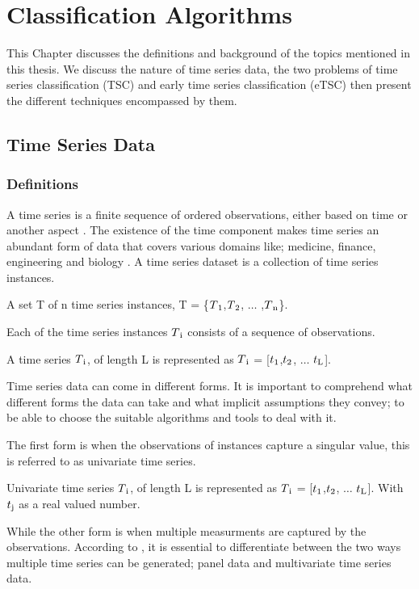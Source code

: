 \chapter{Classification Algorithms}
\label{ChapterClassificationAlgorithms}
This Chapter discusses the definitions and background of the topics mentioned in this thesis.
We discuss the nature of time series data, the two problems of time series classification (TSC) and early time series classification (eTSC) then present the different techniques encompassed by them.

\section{Time Series Data}
\label{TimeSeriesData}

\subsection{Definitions}
\label{TSDefinitions}
A time series is a finite sequence of ordered observations, either based on time or another aspect \cite{abanda2019review,bagnall2017great}.
The existence of the time component makes time series an abundant form of data that covers various domains like; medicine, finance, engineering and biology \cite{lines2018time}.
A time series dataset is a collection of time series instances.
\begin{definition}
    A set T of n time series instances, T = \{$T\textsubscript{1}$,$T\textsubscript{2}$, $\ldots$ ,$T\textsubscript{n}$\}.
\end{definition}
Each of the time series instances $T\textsubscript{i}$ consists of a sequence of observations.
\begin{definition}
    A time series $T\textsubscript{i}$, of length L is represented as $T\textsubscript{i}$ = [$t\textsubscript{1}$,$t\textsubscript{2}$, $\ldots$ $t\textsubscript{L}$].
\end{definition}
Time series data can come in different forms. It is important to comprehend what different forms the data can take and what implicit assumptions they convey; to be able to choose the suitable algorithms and tools to deal with it.

The first form is when the observations of instances capture a singular value, this is referred to as univariate time series.
\begin{definition}
    Univariate time series $T\textsubscript{i}$, of length L is represented as 
    $T\textsubscript{i}$ = [$t\textsubscript{1}$,$t\textsubscript{2}$, $\ldots$ $t\textsubscript{L}$].
    With $t\textsubscript{j}$ as a real valued number.
\end{definition}
While the other form is when multiple measurments are captured by the observations.
According to \cite{loning2019sktime}, it is essential to differentiate between the two ways multiple time series can be generated; panel data and multivariate time series data.

